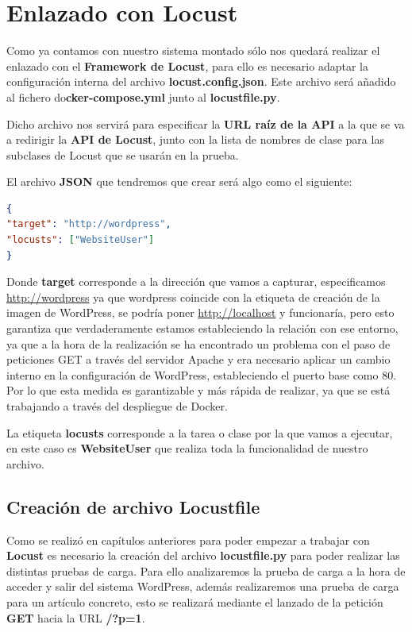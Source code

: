 \section{Enlazado con Locust}
Como ya contamos con nuestro sistema montado sólo nos quedará realizar el enlazado con el \textbf{Framework de Locust}, para ello es necesario adaptar la configuración interna del archivo \textbf{locust.config.json}. Este archivo será añadido al fichero do\textbf{cker-compose.yml} junto al \textbf{locustfile.py}.

Dicho archivo nos servirá para especificar la \textbf{URL raíz de la API} a la que se va a redirigir la \textbf{API de Locust}, junto con la lista de nombres de clase para las subclases de Locust que se usarán en la prueba.

El archivo \textbf{JSON} que tendremos que crear será algo como el siguiente:

\begin{lstlisting}[language=json,firstnumber=1]
{
"target": "http://wordpress",
"locusts": ["WebsiteUser"]
}
\end{lstlisting}

Donde \textbf{target} corresponde a la dirección que vamos a capturar, especificamos  \url{http://wordpress} ya que wordpress coincide con la etiqueta de creación de la imagen de WordPress, se podría poner  \url{http://localhost} y funcionaría, pero esto garantiza que verdaderamente estamos estableciendo la relación con ese entorno, ya que a la hora de la realización se ha encontrado un problema con el paso de peticiones GET a través del servidor Apache y era necesario aplicar un cambio interno en la configuración de WordPress, estableciendo el puerto base como 80. Por lo que esta medida es garantizable y más rápida de realizar, ya que se está trabajando a través del despliegue de Docker.

La etiqueta \textbf{locusts} corresponde a la tarea o clase por la que vamos a ejecutar, en este caso es \textbf{WebsiteUser} que realiza toda la funcionalidad de nuestro archivo.
\newpage
\subsection{Creación de archivo Locustfile}

Como se realizó en capítulos anteriores para poder empezar a trabajar con \textbf{Locust} es necesario la creación del archivo \textbf{locustfile.py} para poder realizar las distintas pruebas de carga. Para ello analizaremos la prueba de carga a la hora de acceder y salir del sistema WordPress, además realizaremos una prueba de carga para un artículo concreto, esto se realizará mediante el lanzado de la petición \textbf{GET} hacia la URL \textbf{/?p=1}.

